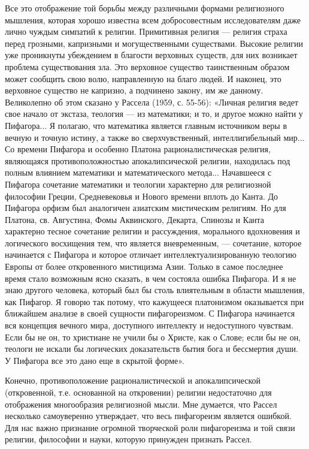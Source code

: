 Все это отображение той борьбы между различными формами религиозного
мышления, которая хорошо известна всем добросовестным исследователям
даже лично чуждым симпатий к религии. Примитивная религия --- религия
страха перед грозными, капризными и могущественными существами.
Высокие религии уже проникнуты убеждением в благости верховных
существ, для них возникает проблема существования зла. Это верховное
существо таинственным образом может сообщить свою волю, направленную
на благо людей. И наконец, это верховное существо не капризно, а
подчинено закону, им же данному. Великолепно об этом сказано у Рассела
(1959, с. 55-56): «Личная религия ведет свое начало от экстаза,
теология --- из математики; и то, и другое можно найти у Пифагора... Я
полагаю, что математика является главным источником веры в вечную и
точную истину, а также во сверхчувственный, интеллигибельный мир... Со
времени Пифагора и особенно Платона рационалистическая религия,
являющаяся противоположностью апокалипсической религии, находилась под
полным влиянием математики и математического метода... Начавшееся с
Пифагора сочетание математики и теологии характерно для религиозной
философии Греции, Средневековья и Нового времени вплоть до Канта. До
Пифагора орфизм был аналогичен азиатским мистическим религиям. Но для
Платона, св. Августина, Фомы Аквинского, Декарта, Спинозы и Канта
характерно тесное сочетание религии и рассуждения, морального
вдохновения и логического восхищения тем, что является вневременным,
--- сочетание, которое начинается с Пифагора и которое отличает
интеллектуализированную теологию Европы от более откровенного
мистицизма Азии. Только в самое последнее время стало возможным ясно
сказать, в чем состояла ошибка Пифагора. И я не знаю другого человека,
который был бы столь влиятельным в области мышления, как Пифагор. Я
говорю так потому, что кажущееся платонизмом оказывается при ближайшем
анализе в своей сущности пифагореизмом. С Пифагора начинается вся
концепция вечного мира, доступного интеллекту и недоступного чувствам.
Если бы не он, то христиане не учили бы о Христе, как о Слове; если бы
не он, теологи не искали бы логических доказательств бытия бога и
бессмертия души. У Пифагора все это дано еще в скрытой форме».

Конечно, противоположение рационалистической и апокалипсической
(откровенной, т.е. основанной на откровении) религии недостаточно для
отображения многообразия религиозной мысли. Мне думается, что Рассел
несколько самоуверенно утверждает, что весь пифагореизм является
ошибкой. Для нас важно признание огромной творческой роли пифагореизма
и той связи религии, философии и науки, которую принужден признать
Рассел.

